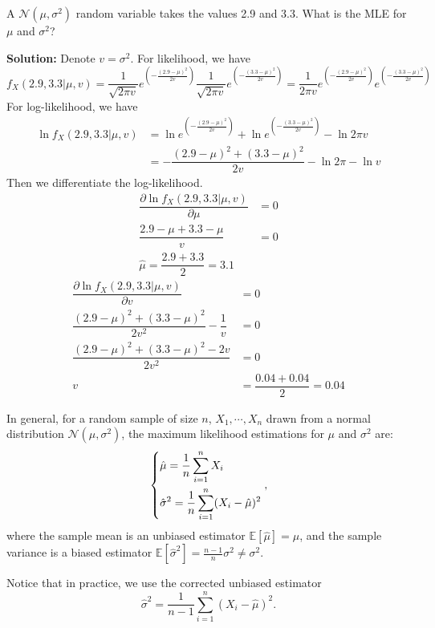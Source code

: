 \begin{eg}
  A \(\mathcal{N} (\mu, \sigma^2)\) random variable takes the values 2.9 and 3.3. What is the MLE for \(\mu\) and \(\sigma^2\)?

  \textbf{Solution:} 
  Denote \(v = \sigma^2\). For likelihood, we have 
  \[
    f_X(2.9, 3.3 \vert \mu, v) = \dfrac{1}{\sqrt{2\pi v}} e^{\left(-\frac{(2.9 - \mu)^2}{2v}\right)}\dfrac{1}{\sqrt{2\pi v}} e^{\left(-\frac{(3.3 - \mu)^2}{2v}\right)} = \dfrac{1}{2\pi v} e^{\left(-\frac{(2.9 - \mu)^2}{2v}\right)} e^{\left(-\frac{(3.3 - \mu)^2}{2v}\right)}
  \]
  For log-likelihood, we have 
  \[
  \begin{aligned}
    \ln f_X(2.9, 3.3 \vert \mu, v) &= \ln e^{\left(-\frac{(2.9 - \mu)^2}{2v}\right)} + \ln e^{\left(-\frac{(3.3 - \mu)^2}{2v}\right)} - \ln 2\pi v \\
    &= - \dfrac{(2.9 - \mu)^2 + (3.3 - \mu)^2}{2v} - \ln 2\pi - \ln v
  \end{aligned}
  \]
  Then we differentiate the log-likelihood. 
  \[
    \begin{aligned}
      \dfrac{\partial \ln f_X(2.9, 3.3 \vert \mu, v)}{\partial \mu} &= 0 \\
      \dfrac{2.9 - \mu + 3.3 - \mu}{v} &= 0 \\
      \hat{\mu} = \dfrac{2.9 + 3.3}{2} = 3.1
    \end{aligned}
  \]
  \[
    \begin{aligned}
      \dfrac{\partial \ln f_X(2.9, 3.3 \vert \mu, v)}{\partial v} &= 0 \\
      \dfrac{(2.9 - \mu)^2 + (3.3 - \mu)^2}{2v^2} - \dfrac{1}{v} &= 0 \\
      \dfrac{(2.9 - \mu)^2 + (3.3 - \mu)^2 - 2v}{2v^2} &= 0 \\
      v &= \dfrac{0.04 + 0.04}{2} = 0.04
    \end{aligned}
  \]
\end{eg}

In general, for a random sample of size \(n\), \(X_1, \cdots, X_n\) drawn from a normal distribution \(\mathcal{N}(\mu, \sigma^2)\), the maximum likelihood estimations for \(\mu\) and \(\sigma^2\) are:
\[
  \begin{dcases}
    \hat{\mu} = \dfrac{1}{n} \sum_{i = 1}^n X_i \\
    \hat{\sigma}^2 = \dfrac{1}{n} \sum_{i = 1}^n (X_i - \hat{\mu})^2
  \end{dcases} ,
\]
where the sample mean is an unbiased estimator \(\mathbb{E}[\hat{\mu}] = \mu\), and the sample variance is a biased estimator \(\mathbb{E}[\hat{\sigma}^2] = \frac{n - 1}{n} \sigma^2 \neq \sigma^2\). 

Notice that in practice, we use the corrected unbiased estimator
\[
  \hat{\sigma}^2 = \dfrac{1}{n - 1} \sum_{i = 1}^n (X_i - \hat{\mu})^2. 
\]

